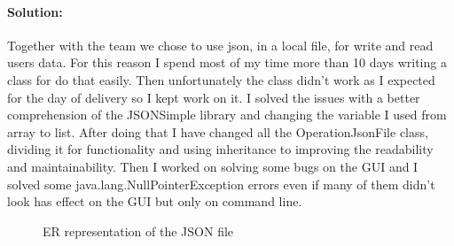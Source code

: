 \documentclass[a4paper,12pt]{report}
\begin{document}
		\paragraph{Solution:}Together with the team we chose to use json, in a local file, for write and read users data. For this reason I spend most of my time more than 10 days writing a class for do that easily.
        Then unfortunately the class didn't work as I expected for the day of delivery so I kept work on it. I solved the issues with a better comprehension of the JSONSimple library and changing the variable I used from array to list.
        After doing that I have changed all the OperationJsonFile class, dividing it for functionality and using inheritance to improving the readability and maintainability.
        Then I worked on solving some bugs on the GUI and I solved some java.lang.NullPointerException errors even if many of them didn't look has effect on the GUI but only on command line.
		\\
		\begin{figure}[H]
                \caption{ER representation of the JSON file}
                \label{fig:my_label}
            \end{figure}
\end{document}

